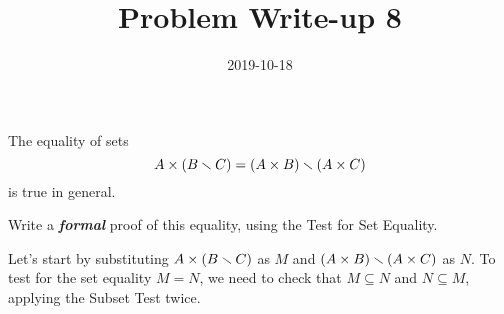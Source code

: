 \documentclass[a4paper,12pt]{article}
\title{Problem Write-up 8}
\date{2019-10-18}
\begin{document}
	\begin{problem}
		The equality of sets \[A \times (B \smallsetminus C) = (A \times B) \smallsetminus (A \times C)\] is true in general.
		
		Write a \textbf{\textit{formal}} proof of this equality, using the Test for Set Equality.	
	\end{problem}
	\begin{answer}
		Let's start by substituting \(A \times (B \smallsetminus C)\) as \(M\) and \((A \times B) \smallsetminus (A \times C)\) as \(N\). To test for the set equality \(M = N\), we need to check that \(M \subseteq N\) and \(N \subseteq M\), applying the Subset Test twice. 
	\end{answer}
\end{document}
